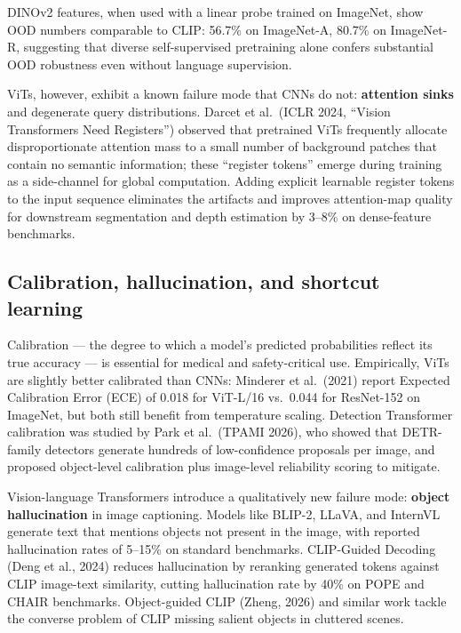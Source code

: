 \documentclass{article}
\begin{document}
DINOv2 features, when used with a linear probe trained on ImageNet, show OOD numbers comparable to CLIP: 56.7\% on ImageNet-A, 80.7\% on ImageNet-R, suggesting that diverse self-supervised pretraining alone confers substantial OOD robustness even without language supervision.

ViTs, however, exhibit a known failure mode that CNNs do not: \textbf{attention sinks} and degenerate query distributions. Darcet et al.~(ICLR 2024, ``Vision Transformers Need Registers'') observed that pretrained ViTs frequently allocate disproportionate attention mass to a small number of background patches that contain no semantic information; these ``register tokens'' emerge during training as a side-channel for global computation. Adding explicit learnable register tokens to the input sequence eliminates the artifacts and improves attention-map quality for downstream segmentation and depth estimation by 3--8\% on dense-feature benchmarks.

\subsection{Calibration, hallucination, and shortcut learning}\label{calibration-hallucination-and-shortcut-learning}

Calibration --- the degree to which a model's predicted probabilities reflect its true accuracy --- is essential for medical and safety-critical use. Empirically, ViTs are slightly better calibrated than CNNs: Minderer et al.~(2021) report Expected Calibration Error (ECE) of 0.018 for ViT-L/16 vs.~0.044 for ResNet-152 on ImageNet, but both still benefit from temperature scaling. Detection Transformer calibration was studied by Park et al.~(TPAMI 2026), who showed that DETR-family detectors generate hundreds of low-confidence proposals per image, and proposed object-level calibration plus image-level reliability scoring to mitigate.

Vision-language Transformers introduce a qualitatively new failure mode: \textbf{object hallucination} in image captioning. Models like BLIP-2, LLaVA, and InternVL generate text that mentions objects not present in the image, with reported hallucination rates of 5--15\% on standard benchmarks. CLIP-Guided Decoding (Deng et al., 2024) reduces hallucination by reranking generated tokens against CLIP image-text similarity, cutting hallucination rate by 40\% on POPE and CHAIR benchmarks. Object-guided CLIP (Zheng, 2026) and similar work tackle the converse problem of CLIP missing salient objects in cluttered scenes.
\end{document}
